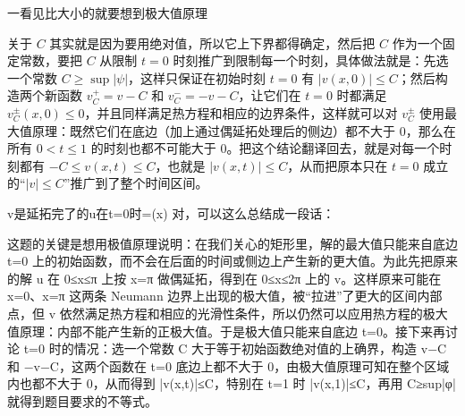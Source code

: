 \begin{dxtips}
    一看见比大小的就要想到极大值原理
\end{dxtips}
\begin{dxtips}
    关于 $C$ 其实就是因为要用绝对值，所以它上下界都得确定，然后把 $C$ 作为一个固定常数，要把 $C$ 从限制 $t=0$ 时刻推广到限制每一个时刻，具体做法就是：先选一个常数 $C\ge \sup|\psi|$，这样只保证在初始时刻 $t=0$ 有 $|v(x,0)|\le C$；然后构造两个新函数 $v_C^{+}=v-C$ 和 $v_C^{-}=-v-C$，让它们在 $t=0$ 时都满足 $v_C^{\pm}(x,0)\le 0$，并且同样满足热方程和相应的边界条件，这样就可以对 $v_C^{\pm}$ 使用最大值原理：既然它们在底边（加上通过偶延拓处理后的侧边）都不大于 $0$，那么在所有 $0<t\le1$ 的时刻也都不可能大于 $0$。把这个结论翻译回去，就是对每一个时刻都有 $-C\le v(x,t)\le C$，也就是 $|v(x,t)|\le C$，从而把原本只在 $t=0$ 成立的“$|v|\le C$”推广到了整个时间区间。
\end{dxtips}
\begin{dxtips}
    v是延拓完了的u在t=0时=\psi(x)
    对，可以这么总结成一段话：

这题的关键是想用极值原理说明：在我们关心的矩形里，解的最大值只能来自底边 t=0 上的初始函数，而不会在后面的时间或侧边上产生新的更大值。为此先把原来的解 u 在 0≤x≤π 上按 x=π 做偶延拓，得到在 0≤x≤2π 上的 v。这样原来可能在 x=0、x=π 这两条 Neumann 边界上出现的极大值，被“拉进”了更大的区间内部点，但 v 依然满足热方程和相应的光滑性条件，所以仍然可以应用热方程的极大值原理：内部不能产生新的正极大值。于是极大值只能来自底边 t=0。接下来再讨论 t=0 时的情况：选一个常数 C 大于等于初始函数绝对值的上确界，构造 v−C 和 −v−C，这两个函数在 t=0 底边上都不大于 0，由极大值原理可知在整个区域内也都不大于 0，从而得到 |v(x,t)|≤C，特别在 t=1 时 |v(x,1)|≤C，再用 C≥sup|φ| 就得到题目要求的不等式。
\end{dxtips}
